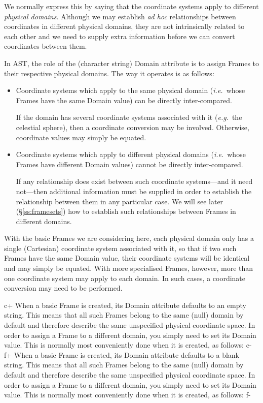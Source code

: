 \documentclass[twoside,11pt]{article}
\newcommand{\secref}[1]{\S\ref{#1}}
\newcommand{\secref}[1]{\ref{#1}}
\begin{document}
We normally express this by saying that the coordinate systems apply
to different {\em{physical domains}}. Although we may establish
{\em{ad hoc}} relationships between coordinates in different physical
domains, they are not intrinsically related to each other and we need
to supply extra information before we can convert coordinates between
them.

In AST, the role of the (character string) Domain attribute is to
assign Frames to their respective physical domains. The way it
operates is as follows:

\begin{itemize}
\item Coordinate systems which apply to the same physical domain
({\em{i.e.}}\ whose Frames have the same Domain value) can be directly
inter-compared.

If the domain has several coordinate systems associated with it
({\em{e.g.}}\ the celestial sphere), then a coordinate conversion may
be involved. Otherwise, coordinate values may simply be equated.

\item Coordinate systems which apply to different physical domains
({\em{i.e.}}\ whose Frames have different Domain values) cannot be
directly inter-compared.

If any relationship does exist between such coordinate systems---and
it need not---then additional information must be supplied in order to
establish the relationship between them in any particular case. We
will see later (\secref{ss:framesets}) how to establish such
relationships between Frames in different domains.
\end{itemize}

With the basic Frames we are considering here, each physical domain only
has a single (Cartesian) coordinate system associated with it, so that if
two such Frames have the same Domain value, their coordinate systems will
be identical and may simply be equated. With more specialised Frames,
however, more than one coordinate system may apply to each domain. In
such cases, a coordinate conversion may need to be performed.

c+
When a basic Frame is created, its Domain attribute defaults to an
empty string. This means that all such Frames belong to the same
(null) domain by default and therefore describe the same unspecified
physical coordinate space. In order to assign a Frame to a different
domain, you simply need to set its Domain value. This is normally most
conveniently done when it is created, as follows:
c-
f+
When a basic Frame is created, its Domain attribute defaults to a
blank string. This means that all such Frames belong to the same
(null) domain by default and therefore describe the same unspecified
physical coordinate space. In order to assign a Frame to a different
domain, you simply need to set its Domain value. This is normally most
conveniently done when it is created, as follows:
f-
\end{document}
